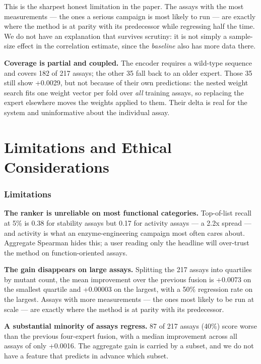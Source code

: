 \documentclass{article}
\begin{document}
This is the sharpest honest limitation in the paper. The assays with the most measurements --- the ones a
serious campaign is most likely to run --- are exactly where the method is at parity with its predecessor
while regressing half the time. We do not have an explanation that survives scrutiny: it is not simply a
sample-size effect in the correlation estimate, since the \emph{baseline} also has more data there.

\textbf{Coverage is partial and coupled.} The encoder requires a wild-type sequence and covers 182 of 217
assays; the other 35 fall back to an older expert. Those 35 still show +0.0029, but not because of their
own predictions: the nested weight search fits one weight vector per fold over \emph{all} training assays, so
replacing the expert elsewhere moves the weights applied to them. Their delta is real for the system and
uninformative about the individual assay.

\section{Limitations and Ethical Considerations}\label{limitations-and-ethical-considerations}

\subsubsection*{Limitations}\label{limitations}

\textbf{The ranker is unreliable on most functional categories.} Top-of-list recall at 5\% is 0.38 for
stability assays but 0.17 for activity assays --- a 2.2x spread --- and activity is what an
enzyme-engineering campaign most often cares about. Aggregate Spearman hides this; a user reading only
the headline will over-trust the method on function-oriented assays.

\textbf{The gain disappears on large assays.} Splitting the 217 assays into quartiles by mutant count, the
mean improvement over the previous fusion is +0.0073 on the smallest quartile and +0.00003 on the
largest, with a 50\% regression rate on the largest. Assays with more measurements --- the ones most
likely to be run at scale --- are exactly where the method is at parity with its predecessor.

\textbf{A substantial minority of assays regress.} 87 of 217 assays (40\%) score worse than the previous
four-expert fusion, with a median improvement across all assays of only +0.0016. The aggregate gain is
carried by a subset, and we do not have a feature that predicts in advance which subset.
\end{document}
